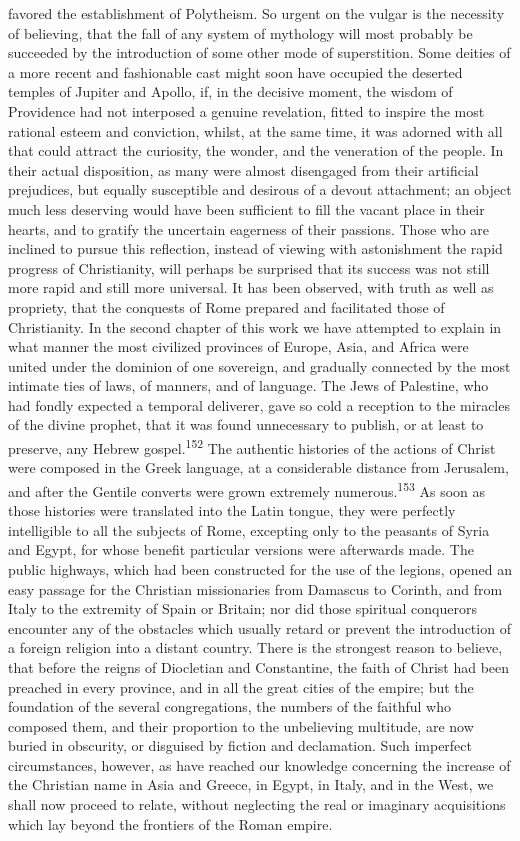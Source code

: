 favored the establishment of Polytheism. So urgent on the vulgar
is the necessity of believing, that the fall of any system of
mythology will most probably be succeeded by the introduction of
some other mode of superstition. Some deities of a more recent
and fashionable cast might soon have occupied the deserted
temples of Jupiter and Apollo, if, in the decisive moment, the
wisdom of Providence had not interposed a genuine revelation,
fitted to inspire the most rational esteem and conviction,
whilst, at the same time, it was adorned with all that could
attract the curiosity, the wonder, and the veneration of the
people. In their actual disposition, as many were almost
disengaged from their artificial prejudices, but equally
susceptible and desirous of a devout attachment; an object much
less deserving would have been sufficient to fill the vacant
place in their hearts, and to gratify the uncertain eagerness of
their passions. Those who are inclined to pursue this reflection,
instead of viewing with astonishment the rapid progress of
Christianity, will perhaps be surprised that its success was not
still more rapid and still more universal. It has been observed,
with truth as well as propriety, that the conquests of Rome
prepared and facilitated those of Christianity. In the second
chapter of this work we have attempted to explain in what manner
the most civilized provinces of Europe, Asia, and Africa were
united under the dominion of one sovereign, and gradually
connected by the most intimate ties of laws, of manners, and of
language. The Jews of Palestine, who had fondly expected a
temporal deliverer, gave so cold a reception to the miracles of
the divine prophet, that it was found unnecessary to publish, or
at least to preserve, any Hebrew gospel.\textsuperscript{152} The authentic
histories of the actions of Christ were composed in the Greek
language, at a considerable distance from Jerusalem, and after
the Gentile converts were grown extremely numerous.\textsuperscript{153} As soon
as those histories were translated into the Latin tongue, they
were perfectly intelligible to all the subjects of Rome,
excepting only to the peasants of Syria and Egypt, for whose
benefit particular versions were afterwards made. The public
highways, which had been constructed for the use of the legions,
opened an easy passage for the Christian missionaries from
Damascus to Corinth, and from Italy to the extremity of Spain or
Britain; nor did those spiritual conquerors encounter any of the
obstacles which usually retard or prevent the introduction of a
foreign religion into a distant country. There is the strongest
reason to believe, that before the reigns of Diocletian and
Constantine, the faith of Christ had been preached in every
province, and in all the great cities of the empire; but the
foundation of the several congregations, the numbers of the
faithful who composed them, and their proportion to the
unbelieving multitude, are now buried in obscurity, or disguised
by fiction and declamation. Such imperfect circumstances,
however, as have reached our knowledge concerning the increase of
the Christian name in Asia and Greece, in Egypt, in Italy, and in
the West, we shall now proceed to relate, without neglecting the
real or imaginary acquisitions which lay beyond the frontiers of
the Roman empire.

